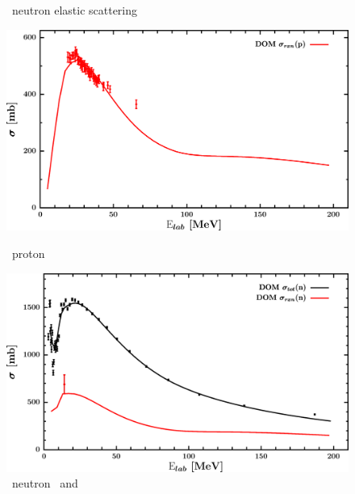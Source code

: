 \begin{figure}[hbtp]
\begin{minipage}{0.47\textwidth}
        \caption*{\oSix\ neutron elastic scattering}
        \label{DOMFitData_o16_neutron_elastic}
    \end{minipage}
\end{figure}
\vspace{0.70in}
\begin{figure}[hbtp]
    \centering
    \begin{minipage}{0.47\textwidth}
        \centering
        \includegraphics[width=\linewidth]{figures/o16_protonInelastic.png}
        \caption*{\oSix\ proton \rxn}
        \label{DOMFitData_o16_proton_inelastic}
    \end{minipage}\hspace{6pt}
    \begin{minipage}{0.47\textwidth}
        \centering
        \includegraphics[width=\textwidth]{figures/o16_neutronInelastic.png}
        \caption*{\oSix\ neutron \rxn\ and \tot}
        \label{DOMFitData_o16_neutron_inelastic}
    \end{minipage}
\end{figure}
